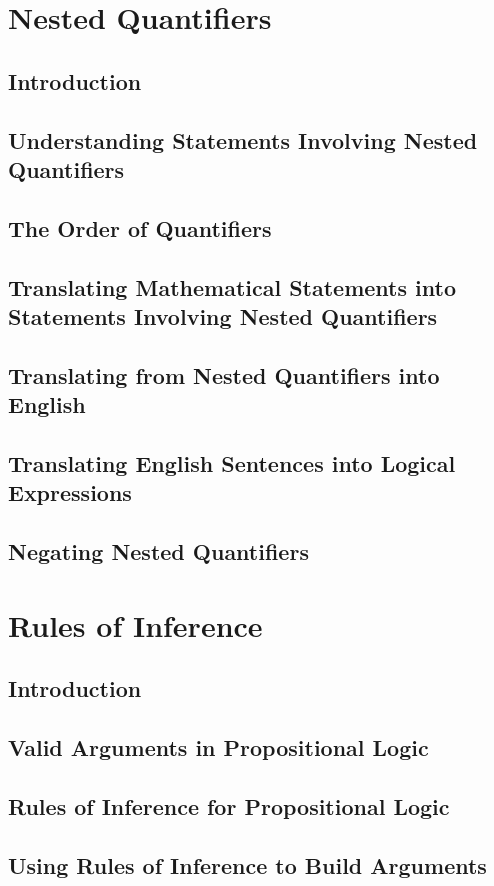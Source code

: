 \documentclass[11pt]{book}
\begin{document}
 \section{Nested Quantifiers}
  \subsection{Introduction}
  \subsection{Understanding Statements Involving Nested Quantifiers}
  \subsection{The Order of Quantifiers}
  \subsection{Translating Mathematical Statements into Statements Involving Nested Quantifiers}
  \subsection{Translating from Nested Quantifiers into English}
  \subsection{Translating English Sentences into Logical Expressions}
  \subsection{Negating Nested Quantifiers}
  
 \section{Rules of Inference}
  \subsection{Introduction}
  \subsection{Valid Arguments in Propositional Logic}
  \subsection{Rules of Inference for Propositional Logic}
  \subsection{Using Rules of Inference to Build Arguments}
\end{document}
